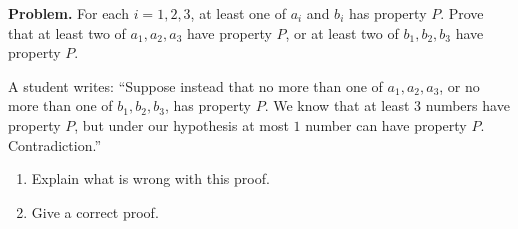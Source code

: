 \textbf{Problem.} For each $i=1,2,3$, at least one of $a_i$ and $b_i$ has property $P$. Prove that at least two of $a_1,a_2,a_3$ have property $P$, or at least two of $b_1,b_2,b_3$ have property $P$.

A student writes: ``Suppose instead that no more than one of $a_1,a_2,a_3$, or no more than one of $b_1,b_2,b_3$, has property $P$. We know that at least $3$ numbers have property $P$, but under our hypothesis at most $1$ number can have property $P$. Contradiction.''
\begin{enumerate}
\item[(a)] Explain what is wrong with this proof.
\item[(b)] Give a correct proof.
\end{enumerate}
